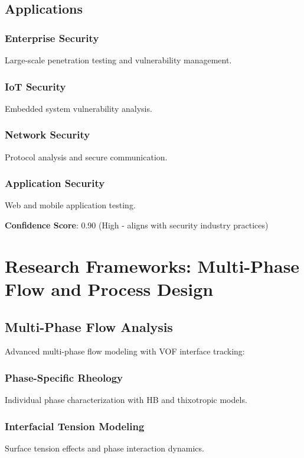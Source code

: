 \documentclass[11pt,a4paper]{article}
\begin{document}
\subsection{Applications}

\subsubsection{Enterprise Security}
Large-scale penetration testing and vulnerability management.

\subsubsection{IoT Security}
Embedded system vulnerability analysis.

\subsubsection{Network Security}
Protocol analysis and secure communication.

\subsubsection{Application Security}
Web and mobile application testing.

\textbf{Confidence Score}: 0.90 (High - aligns with security industry practices)

\section{Research Frameworks: Multi-Phase Flow and Process Design}
\label{sec:frameworks}

\subsection{Multi-Phase Flow Analysis}

Advanced multi-phase flow modeling with VOF interface tracking:

\subsubsection{Phase-Specific Rheology}
Individual phase characterization with HB and thixotropic models.

\subsubsection{Interfacial Tension Modeling}
Surface tension effects and phase interaction dynamics.
\end{document}

